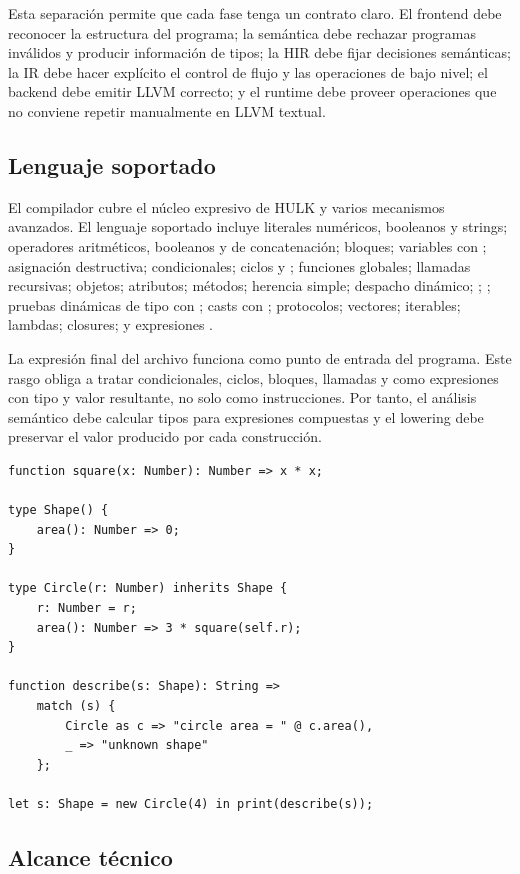 \documentclass[12pt,letterpaper]{article}
\newcommand{\repo}[1]{\texttt{\detokenize{#1}}}
\newcommand{\hulk}{\textsc{HULK}}
\begin{document}
Esta separación permite que cada fase tenga un contrato claro. El frontend debe reconocer la estructura del programa; la semántica debe rechazar programas inválidos y producir información de tipos; la HIR debe fijar decisiones semánticas; la IR debe hacer explícito el control de flujo y las operaciones de bajo nivel; el backend debe emitir LLVM correcto; y el runtime debe proveer operaciones que no conviene repetir manualmente en LLVM textual.

\subsection{Lenguaje soportado}

El compilador cubre el núcleo expresivo de \hulk{} y varios mecanismos avanzados. El lenguaje soportado incluye literales numéricos, booleanos y strings; operadores aritméticos, booleanos y de concatenación; bloques; variables con \repo{let}; asignación destructiva; condicionales; ciclos \repo{while} y \repo{for}; funciones globales; llamadas recursivas; objetos; atributos; métodos; herencia simple; despacho dinámico; \repo{self}; \repo{base}; pruebas dinámicas de tipo con \repo{is}; casts con \repo{as}; protocolos; vectores; iterables; lambdas; closures; y expresiones \repo{match}.

La expresión final del archivo funciona como punto de entrada del programa. Este rasgo obliga a tratar condicionales, ciclos, bloques, llamadas y \repo{match} como expresiones con tipo y valor resultante, no solo como instrucciones. Por tanto, el análisis semántico debe calcular tipos para expresiones compuestas y el lowering debe preservar el valor producido por cada construcción.

\begin{lstlisting}[language=HULK,caption={Programa simple con funciones, objetos, herencia y match}]
function square(x: Number): Number => x * x;

type Shape() {
    area(): Number => 0;
}

type Circle(r: Number) inherits Shape {
    r: Number = r;
    area(): Number => 3 * square(self.r);
}

function describe(s: Shape): String =>
    match (s) {
        Circle as c => "circle area = " @ c.area(),
        _ => "unknown shape"
    };

let s: Shape = new Circle(4) in print(describe(s));
\end{lstlisting}

\subsection{Alcance técnico}
\end{document}
